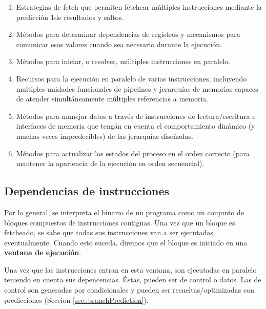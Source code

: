 \begin{enumerate}
	\item Estrategias de fetch que permiten fetchear múltiples instrucciones mediante la predicción 1de resultados y saltos.
	\item Métodos para determinar dependencias de registros y mecanismos para comunicar esos valores cuando sea necesario durante la ejecución.
	\item Métodos para iniciar, o resolver, múltiples instrucciones en paralelo.
	\item Recursos para la ejecución en paralelo de varias instrucciones, incluyendo multiples unidades funcionales de pipelines y jerarquías de memorias capaces de atender simultáneamente múltiples referencias a memoria.
	\item Métodos para manejar datos a través de instrucciones de lectura/escritura e interfaces de memoria que tengán en cuenta el comportamiento dinámico (y muchas veces impredecibles) de las jerarquías diseñadas.
	\item Métodos para actualizar los estados del proceso en el orden correcto (para mantener la apariencia de la ejecución en orden secuencial).
\end{enumerate}

\subsection{Dependencias de instrucciones}\label{sec:instructionLevelParalelism:dependenciaDeInstrucciones}
Por lo general, se interpreta el binario de un programa como un conjunto de bloques compuestos de instrucciones contiguas. Una vez que un bloque es fetcheado, se sabe que todas sus instrucciones van a ser ejecutadas eventualmente. Cuando esto suceda, diremos que el bloque es iniciado en una \textbf{ventana de ejecución}.

Una vez que las instrucciones entran en esta ventana, son ejecutadas en paralelo teniendo en cuenta sus depencencias. Éstas, pueden ser de control o datos. Las de control son generadas por condicionales y pueden ser resueltas/optimizadas con predicciones (Seccion \ref{sec::branchPrediction}). 

